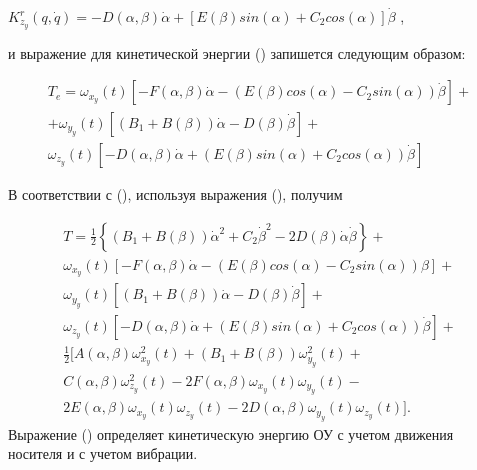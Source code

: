 \( 
K_{z_{y}}^{r} ( q,\dot{q} ) =
-D (  \alpha , \beta  )  \dot{\alpha} + 
[ 
E (  \beta  ) sin (  \alpha  ) +
C_{2}cos (  \alpha  )  
]  \dot{\beta}  
\) ,\par

и выражение для кинетической энергии () запишется следующим образом:


\begin{equation} %
\label{eq:p3:27}
\begin{multlined}
T_{e}=   
	\omega_{x_{y}} ( t )  
	[ 
		-F (  \alpha , \beta  )  \dot{\alpha} - 
		( 
			E (  \beta  ) cos (  \alpha  ) -
			C_{2}sin (  \alpha  )  
		)  
		\dot{\beta } 
	]  + \\
	+ \omega_{y_{y}} ( t )  
	[  
		( B_{1}+B (  \beta  )  )  
		\dot{\alpha} -
		D (  \beta  )  \dot{\beta }   
	] + \\
	\omega_{z_{y}} ( t )  
	[ 
		-D (  \alpha , \beta  )  \dot{\alpha} + 
		( 
			E (  \beta  ) sin (  \alpha  ) +
			C_{2}cos (  \alpha  )  
		)  \dot{\beta }   
	]   
\end{multlined}
\end{equation}

В соответствии с (), используя выражения (), получим

\begin{equation} %
\label{eq:p3:28}
\begin{multlined}
T=\frac{1}{2} 
\left\lbrace  
	( B_{1}+B (  \beta  )  )  \dot{\alpha}^{2}+
	C_{2} \dot{\beta} ^{2} - 
	2D (  \beta  )  \dot{\alpha}  \dot{\beta}  
\right\rbrace  + \\  
\omega_{x_{y}} ( t )  
[ 
	-F (  \alpha , \beta  )  \dot{\alpha} - 
	(
		E (  \beta  ) cos (  \alpha  ) -
		C_{2}sin (  \alpha  )  
	)  \beta  
]  + \\
\omega_{y_{y}} ( t )  
[  
	( B_{1}+B (  \beta  )  )  \dot{\alpha} -
	D (  \beta  )  \dot{\beta}  
] + \\
\omega_{z_{y}} ( t ) 
[ 
	-D (  \alpha , \beta  )  \dot{\alpha} + 
	( E (  \beta  ) sin (  \alpha  ) +C_{2}cos (  \alpha  )  )  \dot{\beta}  
] + \\
\frac{1}{2} 
[
	A (  \alpha , \beta  )  \omega_{x_{y}}^{2} ( t ) + 
	( B_{1}+B (  \beta  )  )  \omega_{y_{y}}^{2} ( t ) + \\
	C (  \alpha , \beta  )  \omega_{z_{y}}^{2} ( t ) - 
	2F (  \alpha , \beta  )  \omega_{x_{y}} ( t )  \omega_{y_{y}} ( t ) - \\
	2E (  \alpha , \beta  )  \omega_{x_{y}} ( t )  \omega_{z_{y}} ( t ) -
	2D (  \alpha , \beta  )  \omega_{y_{y}} ( t )  \omega_{z_{y}} ( t )  
].
\end{multlined}
\end{equation}
Выражение () определяет кинетическую энергию ОУ с учетом движения носителя и с учетом вибрации. \par

